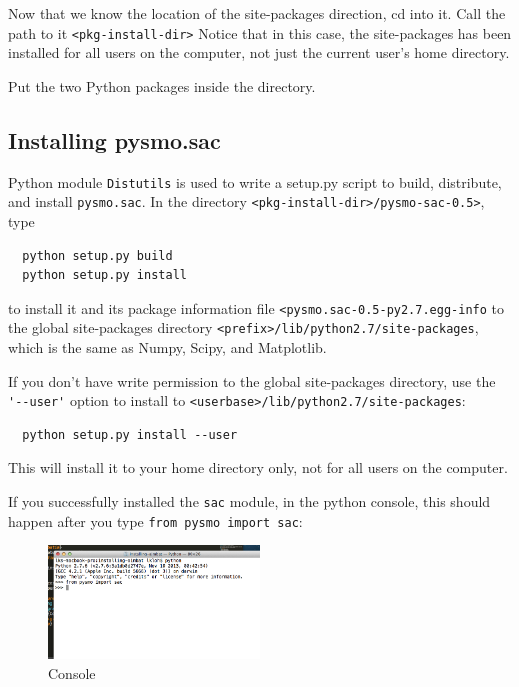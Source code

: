 \documentclass[letterpaper,10pt]{article}
\begin{document}
Now that we know the location of the site-packages direction, cd into it. Call the path to it \verb"<pkg-install-dir>" Notice that in this case, the site-packages has been installed for all users on the computer, not just the current user's home directory. 

Put the two Python packages inside the directory.


\subsection{Installing pysmo.sac}

Python module \verb"Distutils" is used to write a setup.py script to build, distribute, and install \verb"pysmo.sac". In the directory \verb"<pkg-install-dir>/pysmo-sac-0.5>", type 

\begin{verbatim}
  python setup.py build
  python setup.py install
\end{verbatim}

to install it and its package information file \verb"<pysmo.sac-0.5-py2.7.egg-info" to the global site-packages directory \verb"<prefix>/lib/python2.7/site-packages", which is the same as Numpy, Scipy, and Matplotlib.

If you don't have write permission to the global site-packages directory, use the \verb"'--user'" option to install to \verb"<userbase>/lib/python2.7/site-packages":

\begin{verbatim}
  python setup.py install --user
\end{verbatim}

This will install it to your home directory only, not for all users on the computer. 

If you successfully installed the \verb"sac" module, in the python console, this should happen after you type \verb"from pysmo import sac": 

\begin{figure}[h!]
  \centering
  \includegraphics[width=0.5\textwidth]{images/sac_installed}
  \caption{Console}
  \label{fig:sac_installed}
\end{figure}






















\end{document}
